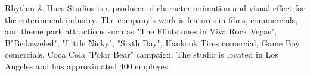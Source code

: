 Rhythm \& Hues Studios is a producer of character animation and visual effect for the enterinment industry. The company's work is features in films, commercials, and theme park attractions such as "The Flintstones in Viva Rock Vegas", B"Bedazzeled", "Little Nicky", "Sixth Day", Hankook Tires comercial, Game Boy comercials, Coca Cola "Polar Bear" campaign. The studio is located in Los Angeles and has approximated 400 employes.


